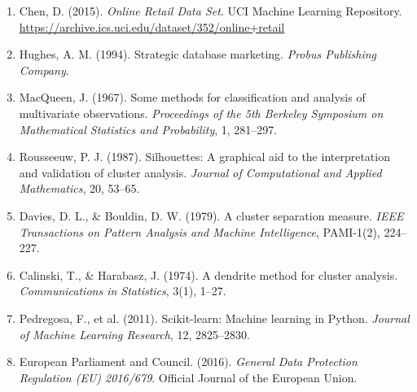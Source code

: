\documentclass[12pt,a4paper]{report}
\begin{document}
\begin{enumerate}[leftmargin=1.8em]
  \item Chen, D. (2015). \textit{Online Retail Data Set}. UCI Machine Learning Repository. \url{https://archive.ics.uci.edu/dataset/352/online+retail}

  \item Hughes, A. M. (1994). Strategic database marketing. \textit{Probus Publishing Company}.

  \item MacQueen, J. (1967). Some methods for classification and analysis of multivariate observations. \textit{Proceedings of the 5th Berkeley Symposium on Mathematical Statistics and Probability}, 1, 281--297.

  \item Rousseeuw, P. J. (1987). Silhouettes: A graphical aid to the interpretation and validation of cluster analysis. \textit{Journal of Computational and Applied Mathematics}, 20, 53--65.

  \item Davies, D. L., \& Bouldin, D. W. (1979). A cluster separation measure. \textit{IEEE Transactions on Pattern Analysis and Machine Intelligence}, PAMI-1(2), 224--227.

  \item Calinski, T., \& Harabasz, J. (1974). A dendrite method for cluster analysis. \textit{Communications in Statistics}, 3(1), 1--27.

  \item Pedregosa, F., et al. (2011). Scikit-learn: Machine learning in Python. \textit{Journal of Machine Learning Research}, 12, 2825--2830.

  \item European Parliament and Council. (2016). \textit{General Data Protection Regulation (EU) 2016/679}. Official Journal of the European Union.
\end{enumerate}
\end{document}
